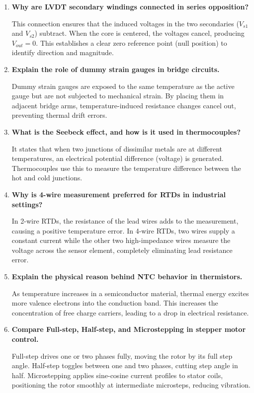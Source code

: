 \documentclass[12pt,a4paper]{article}
\newcommand{\Q}[1]{\textbf{#1}\par\noindent\ignorespaces}
\begin{document}
\begin{tcolorbox}[exambox, title={\textbf{Frequently Asked / Viva Questions}}]
\begin{enumerate}[leftmargin=*, itemsep=4pt]
  \item \Q{Why are LVDT secondary windings connected in series opposition?}
    This connection ensures that the induced voltages in the two secondaries ($V_{s1}$ and $V_{s2}$) subtract. When the core is centered, the voltages cancel, producing $V_{out}=0$. This establishes a clear zero reference point (null position) to identify direction and magnitude.
  \item \Q{Explain the role of dummy strain gauges in bridge circuits.}
    Dummy strain gauges are exposed to the same temperature as the active gauge but are not subjected to mechanical strain. By placing them in adjacent bridge arms, temperature-induced resistance changes cancel out, preventing thermal drift errors.
  \item \Q{What is the Seebeck effect, and how is it used in thermocouples?}
    It states that when two junctions of dissimilar metals are at different temperatures, an electrical potential difference (voltage) is generated. Thermocouples use this to measure the temperature difference between the hot and cold junctions.
  \item \Q{Why is 4-wire measurement preferred for RTDs in industrial settings?}
    In 2-wire RTDs, the resistance of the lead wires adds to the measurement, causing a positive temperature error. In 4-wire RTDs, two wires supply a constant current while the other two high-impedance wires measure the voltage across the sensor element, completely eliminating lead resistance error.
  \item \Q{Explain the physical reason behind NTC behavior in thermistors.}
    As temperature increases in a semiconductor material, thermal energy excites more valence electrons into the conduction band. This increases the concentration of free charge carriers, leading to a drop in electrical resistance.
  \item \Q{Compare Full-step, Half-step, and Microstepping in stepper motor control.}
    Full-step drives one or two phases fully, moving the rotor by its full step angle. Half-step toggles between one and two phases, cutting step angle in half. Microstepping applies sine-cosine current profiles to stator coils, positioning the rotor smoothly at intermediate microsteps, reducing vibration.
\end{enumerate}
\end{tcolorbox}
\end{document}
